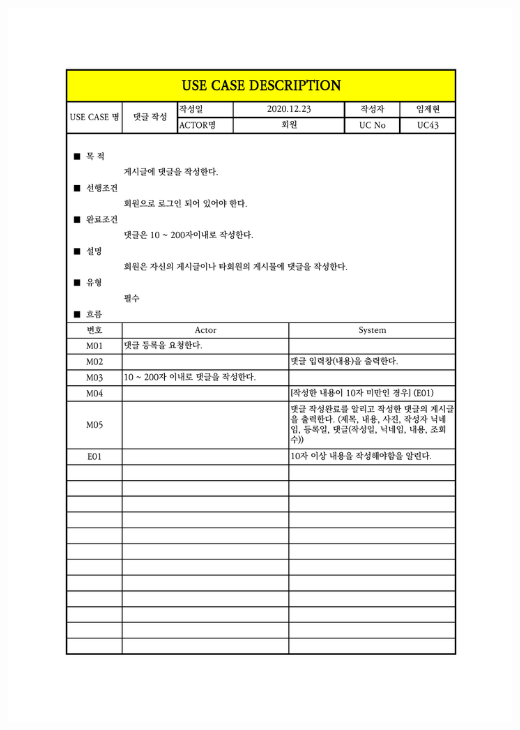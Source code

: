 {{{{{{{{{{{{{{{{{{{{{{{{{{{{{{{{{{{{{{{{{{{{{{\includegraphics[width=1.1\textwidth]{./Figure/Design/Display/usecase/043.pdf} \\
}}}}}}}}}}}}}}}}}}}}}}}}}}}}}}}}}}}}}}}}}}}}}}
